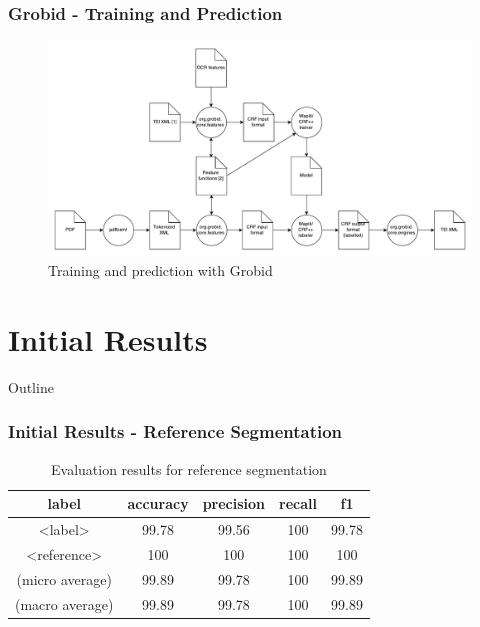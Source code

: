 \documentclass{beamer}
\begin{document}
\begin{frame}
\frametitle{Grobid - Training and Prediction}
\begin{figure}[!ht]
\center
\includegraphics[width=4.5in]{figures/grobid.pdf}
\caption{Training and prediction with Grobid}
\end{figure}
\end{frame}


\section{Initial Results}
\begin{frame}[noframenumbering]{Outline}
\tableofcontents[currentsection]
\end{frame}


\begin{frame}
\frametitle{Initial Results - Reference Segmentation}
\begin{center}
\begingroup

\fontsize{8pt}{10pt}\selectfont
\begin{table}[h]
\begin{tabular}{ccccc}
\hline
label		&accuracy	&precision	&recall		&f1 \\
\hline
<label>		&99.78		&99.56		&100		&99.78\\
<reference>		&100		&100		&100		&100\\
\hline
(micro average) & 99.89		&99.78		&100		&99.89	\\
(macro average) &	99.89 & 99.78	& 100 & 99.89	\\
\hline
\end{tabular}
\caption[Table caption text]{Evaluation results for reference segmentation}
\end{table}

\endgroup
\end{center}

\end{frame}
\end{document}
